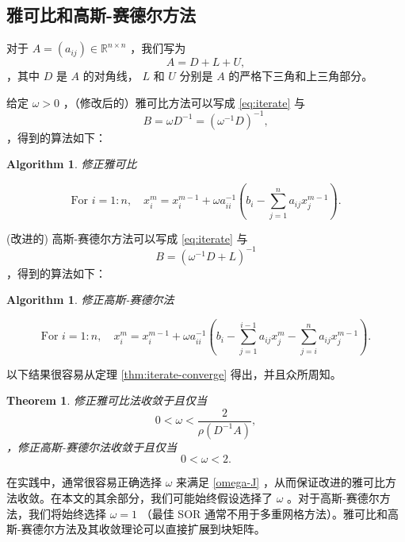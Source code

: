 \documentclass[12pt]{acta_2011xz}
\newtheorem{theorem}{Theorem}[section]
\newtheorem{algorithm}[equation]{Algorithm}
\begin{document}
   \subsection{雅可比和高斯-赛德尔方法  }    对于
   $A=(a_{ij})\in\mathbb R^{n\times n}$    ，我们写为 
   $$
A=D+L+U,
$$    ，其中    $D$    是    $A$    的对角线，   $L$    和    $U$    分别是    $A$    的严格下三角和上三角部分。  

给定    $\omega>0$    ，（修改后的）雅可比方法可以写成
   \eqref{eq:iterate}    与 
   $$
B=\omega D^{-1}=(\omega^{-1} D)^{-1},
$$    ，得到的算法如下：  

   \begin{algorithm}   \caption{修正雅可比  }    
   $$
    \mbox{For } i=1:n,\quad
x_i^{m}=x_i^{m-1}+\omega a_{ii}^{-1}\left(b_i-\sum_{j=1}^{n}a_{ij}x_j^{m-1}\right).
$$     \end{algorithm}     

(改进的) 高斯-赛德尔方法可以写成
   \eqref{eq:iterate}    与 
   $$
B=(\omega^{-1} D+L)^{-1}
$$   ，得到的算法如下：  

   \begin{algorithm}   \caption{修正高斯-赛德尔法  }    
   \label{alg:modifiedGS}    
   $$\mbox{For } i=1:n,\quad 
    x_i^{m}= x_i^{m-1}+\omega a_{ii}^{-1}\left(b_i-\sum_{j=1}^{i-1}a_{ij}x_j^{m}
-\sum_{j=i}^{n}a_{ij}x_j^{m-1}\right).$$     \end{algorithm}     

以下结果很容易从定理
   \ref{thm:iterate-converge}    得出，并且众所周知。
   \begin{theorem}修正雅可比法收敛于且仅当 
   \begin{equation}
  \label{omega-J}
0<\omega<\frac{2}{\rho(D^{-1}A)},   
\end{equation}    ，修正高斯-赛德尔法收敛于且仅当 
   \begin{equation}
\label{omega-GS}
0<\omega<2.
\end{equation}     \end{theorem}    在实践中，通常很容易正确选择    $\omega$    来满足
   \eqref{omega-J}   ，从而保证改进的雅可比方法收敛。在本文的其余部分，我们可能始终假设选择了    $\omega$   。对于高斯-赛德尔方法，我们将始终选择    $\omega=1$   （最佳 SOR 通常不用于多重网格方法）。雅可比和高斯-赛德尔方法及其收敛理论可以直接扩展到块矩阵。  
\end{document}
